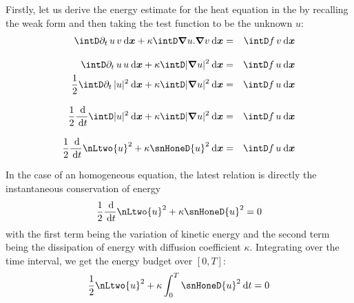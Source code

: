 Firstly, let us derive the energy estimate for the heat equation in the by recalling the weak form and then taking the test function to be the unknown $u$:
\begin{eqnarray*}
\intD \pdt u\, v \dxx + \kappa \intD \Grad u . \Grad v \dxx &=& \intD f\,v \dxx \\[2ex]
\intD \pdt u\, u \dxx + \kappa \intD | \Grad u |^2 \dxx &=& \intD f\,u \dxx \\
\dfrac{1}{2}\intD \pdt |u|^2 \dxx + \kappa \intD | \Grad u |^2 \dxx &=& \intD f\,u \dxx \\[2ex]
\dfrac{1}{2} \ddd{t} \intD  |u|^2 \dxx + \kappa \intD | \Grad u |^2 \dxx &=& \intD f\,u \dxx \\[2ex]
\dfrac{1}{2} \ddd{t} \nLtwo{u}^2 + \kappa \snHoneD{u}^2 \dxx &=& \intD f\,u \dxx
\end{eqnarray*}

In the case of an homogeneous equation, the latest relation is directly the instantaneous conservation of energy
\begin{equation}
\dfrac{1}{2} \ddd{t} \nLtwo{u}^2 + \kappa \snHoneD{u}^2 = 0
\end{equation}
with the first term being the variation of kinetic energy and the second term being the dissipation of energy with diffusion coefficient $\kappa$.
Integrating over the time interval, we get the energy budget over $[0,T]$:
\begin{equation}\label{eq:energy_budget}
\dfrac{1}{2} \nLtwo{u}^2 + \kappa \int_{0}^T \snHoneD{u}^2 \dt = 0
\end{equation}

